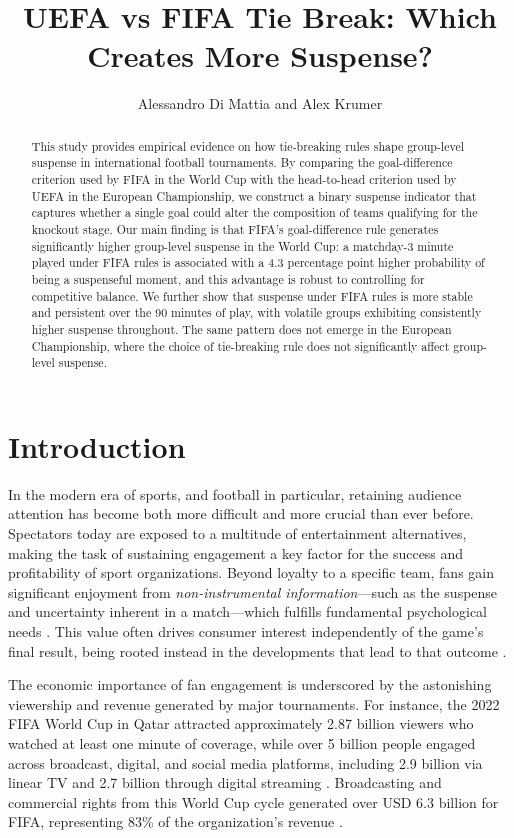 \documentclass[11pt]{article}
\title{UEFA vs FIFA Tie Break: Which Creates More Suspense?}
\author{Alessandro Di Mattia and Alex Krumer}
\date{}
\begin{document}
\maketitle

\begin{abstract}
This study provides empirical evidence on how tie-breaking rules shape group-level suspense in international football tournaments. By comparing the goal-difference criterion used by FIFA in the World Cup with the head-to-head criterion used by UEFA in the European Championship, we construct a binary suspense indicator that captures whether a single goal could alter the composition of teams qualifying for the knockout stage. Our main finding is that FIFA's goal-difference rule generates significantly higher group-level suspense in the World Cup: a matchday-3 minute played under FIFA rules is associated with a 4.3 percentage point higher probability of being a suspenseful moment, and this advantage is robust to controlling for competitive balance. We further show that suspense under FIFA rules is more stable and persistent over the 90 minutes of play, with volatile groups exhibiting consistently higher suspense throughout. The same pattern does not emerge in the European Championship, where the choice of tie-breaking rule does not significantly affect group-level suspense.
\end{abstract}

\newpage

\section{Introduction}

In the modern era of sports, and football in particular, retaining audience attention has become both more difficult and more crucial than ever before. Spectators today are exposed to a multitude of entertainment alternatives, making the task of sustaining engagement a key factor for the success and profitability of sport organizations. Beyond loyalty to a specific team, fans gain significant enjoyment from \emph{non-instrumental information}—such as the suspense and uncertainty inherent in a match—which fulfills fundamental psychological needs \citep{ely2015suspense, zillmann2013psychology}. This value often drives consumer interest independently of the game's final result, being rooted instead in the developments that lead to that outcome \citep{vorderer2004enjoyment}.

The economic importance of fan engagement is underscored by the astonishing viewership and revenue generated by major tournaments. For instance, the 2022 FIFA World Cup in Qatar attracted approximately 2.87 billion viewers who watched at least one minute of coverage, while over 5 billion people engaged across broadcast, digital, and social media platforms, including 2.9 billion via linear TV and 2.7 billion through digital streaming \citep{fifa2022engagement, fifa2022audience}. Broadcasting and commercial rights from this World Cup cycle generated over USD 6.3 billion for FIFA, representing 83\% of the organization's revenue \citep{fifa2022finance}.
\end{document}
